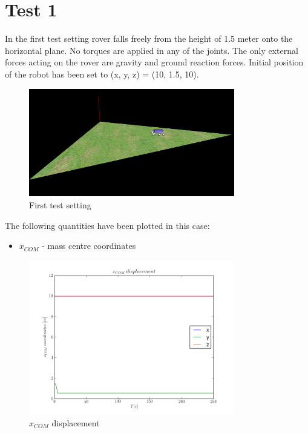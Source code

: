 \newpage
\section{Test 1}
\label{Sec:test_1}

In the first test setting rover falls freely from the height of 1.5 meter onto the horizontal plane.
No torques are applied in any of the joints. The only external forces acting on the rover are
gravity and ground reaction forces. Initial position of the robot has been set to (x, y, z) = (10, 1.5, 10).

\begin{figure}[H]
  \centering
    \includegraphics[width=0.8\textwidth]{run_1}
  \caption{First test setting}
\end{figure}

\noindent The following quantities have been plotted in this case:

\begin{itemize}
  \item $x_{COM}$ - mass centre coordinates
\end{itemize}

\begin{figure}[H]
  \centering
    \includegraphics[width=0.8\textwidth]{xCOM}
  \caption{$x_{COM}$ displacement}
\end{figure}

